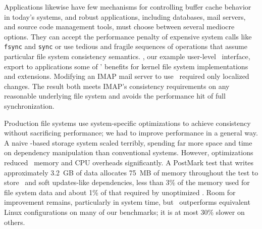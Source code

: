 Applications likewise have few mechanisms
 for controlling buffer cache behavior in today's systems, and
%
robust applications, including databases, mail servers, and source code
 management tools, must choose between several mediocre options.
%
They can accept the performance penalty of expensive system calls like
 \texttt{fsync} and \texttt{sync} or use tedious and fragile sequences
 of operations that assume particular file system consistency semantics.
%
\emph{\Patchgroups}, our example user-level \patch\ interface,
 export to applications some of \patches' benefits
 for kernel file system implementations and extensions.
%
Modifying an IMAP mail server to use \patchgroups\ required only localized
 changes.  The result both meets IMAP's consistency requirements on any reasonable
 underlying file system and avoids the performance hit of full
 synchronization.


\begin{comment}
Our file system modules impose soft updates-style \patch\ requirements by
 default, since doing so requires some knowledge of the file system's
 structures; we have also written a journal module that can change
 existing dependencies to express either full or metadata-only journaling.
%
A file system module not interested in supporting soft updates support
 could instead impose no \patch\ requirements, and count on the journal
 module to provide a consistency guarantee.


The \Kudos\ storage system implementation is decomposed entirely into
 pluggable \modules\ that manipulate \patches, hopefully making the system
 as a whole more configurable, extensible, and easier to understand.
%
Any storage system \module\ can generate \patches; other modules can examine
 them and modify them when required.
%
\Patch\ dependencies are obeyed by all other storage system layers, allowing
 them to be passed through layers such as loopback block devices.
%
As a result, the loosely-coupled \modules\ that implement a file system
 can cooperate to enforce strong and often complex consistency guarantees,
 even though each \module\ only does a small part of the work.
\end{comment}


Production file systems use system-specific optimizations to achieve
 consistency without sacrificing performance; we had to improve
 performance in a general way.
%
A naive \patch-based storage system scaled terribly,
 spending far more space and time on dependency manipulation than
 conventional systems.
%
However, optimizations reduced \patch\ memory and
 CPU overheads significantly.
%
A PostMark test that writes approximately 3.2~GB of data
 allocates 75~MB of memory throughout the test to store \patches\ and
 soft updates-like dependencies, less than 3\% of the memory used for file
 system data and about 1\% of that required by unoptimized
 \Featherstitch.
%
Room for improvement remains, particularly in system time, but
 \Featherstitch\ outperforms equivalent Linux configurations on
 many of our benchmarks; it is at most 30\% slower on others.


